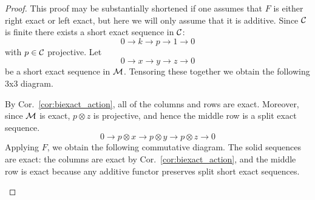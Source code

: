 \documentclass{amsart}
\begin{document}
\begin{proof}
	This proof may be substantially shortened if one assumes that $F$ is either right exact or left exact, but here we will only assume that it is additive. 
	Since $\mathcal C$ is finite there exists a short exact sequence in $\mathcal C$:
	\begin{equation*}
		0 \to k \to p \to 1 \to 0
	\end{equation*}
	with $p \in \mathcal C$ projective. Let
	\begin{equation*}
		0 \to x \to y \to z \to 0
	\end{equation*}
	be a short exact sequence in $\mathcal M$. Tensoring these together we obtain the following $3$x$3$ diagram. 
	\begin{center}
	\end{center}
	By Cor.~\ref{cor:biexact_action}, all of the columns and rows are exact. Moreover, since $\mathcal M$ is exact, $p \otimes z$ is projective, and hence the middle row is a split exact sequence. 
		\begin{equation*}
		0 \to p \otimes x \to p \otimes y \to p \otimes z \to 0 
	\end{equation*}
	Applying $F$, we obtain the following commutative diagram. The solid sequences are exact: the columns are exact by Cor.~\ref{cor:biexact_action}, and the middle row is exact because any additive functor preserves split short exact sequences. 
	\begin{center}
\end{center}
\end{proof}
\end{document}
